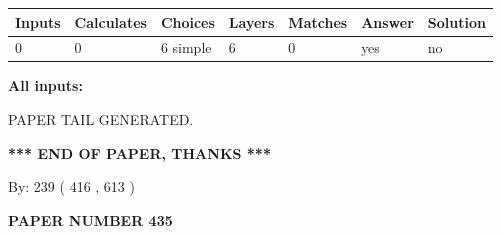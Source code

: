 \documentclass[12pt]{article}
\begin{document}
 
\noindent{}
 
 
   
   
   
   
\noindent\begin{tabular}{|l|l|l|l|l|l|l|}
 \hline
Inputs & Calculates & Choices & Layers & Matches & Answer & Solution \\ \hline
 0  & 
 0  & 
 6
  simple  
  & 
 6  & 
 0  & 
  yes & 
  no 
  \\ \hline
 \end{tabular}
   
   
   
   
\noindent{}
   
   
   
   
\noindent\vspace{0.1in}\hspace{-0.08in} {\textbf{\Large{All inputs: }}}
   
   
   
   
   
   
 \vspace{0.2in}
 
   
   
\vspace{2.0in} PAPER TAIL GENERATED.
   
   
   
   
\vspace{1.0in} 
{\textbf{\large{ *** END OF PAPER, THANKS *** }}} 
   
   
\hspace{1.0in} By: 
 239 ( 416 ,  613 )
   
   
   
   
\newpage 
\setcounter{page}{ 
   435001 } 
   
   
   
   
 {\textbf{ \Large{ PAPER NUMBER  435  }}}
   
   
\vspace{0.2in}
   
   
   
   
   
   
   
   
 \vspace{0.2in}
 
\end{document}
